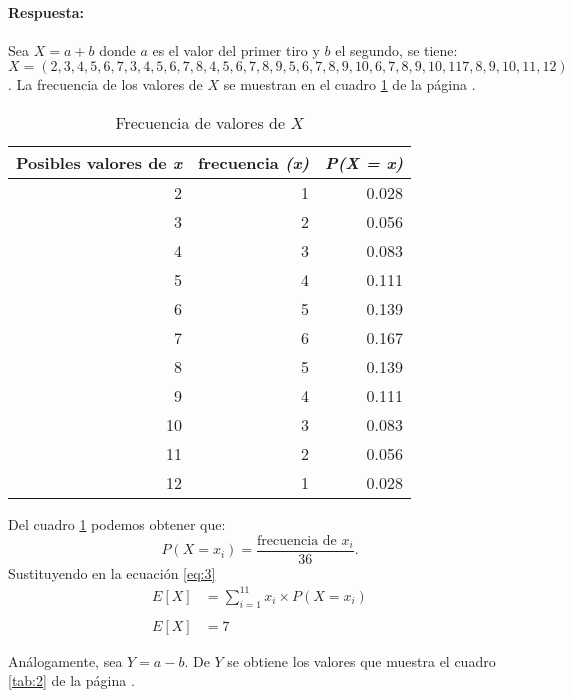 \documentclass{article}
\begin{document}
\paragraph{Respuesta:} Sea $X = a + b$ donde $a$ es el valor del primer tiro y $b$ el segundo, se tiene:
$ X = (2, 3, 4, 5, 6, 7, 3, 4, 5, 6, 7, 8, 4, 5, 6, 7, 8, 9, 5, 6, 7, 8, 9, 10, 6, 7, 8, 9,10,11  7, 8, 9, 10,11, 12)$. La frecuencia de los valores de $X$ se muestran en el cuadro \ref{tab:1} de la página \pageref{tab:1}.

\begin{table}[H]
  \centering
  \caption{Frecuencia de valores de $X$}
    \begin{tabular}{rrr}
    \toprule
    \multicolumn{1}{p{5.39em}}{\textbf{Posibles valores de \textit{\textbf{x}}}} & \multicolumn{1}{l}{\textbf{frecuencia  \textit{\textbf{(x)}}}} & \multicolumn{1}{l}{\textit{\textbf{P(X = x)}}} \\
    \midrule
    2     & 1     & 0.028 \\
    3     & 2     & 0.056 \\
    4     & 3     & 0.083 \\
    5     & 4     & 0.111 \\
    6     & 5     & 0.139 \\
    7     & 6     & 0.167 \\
    8     & 5     & 0.139 \\
    9     & 4     & 0.111 \\
    10    & 3     & 0.083 \\
    11    & 2     & 0.056 \\
    12    & 1     & 0.028 \\
    \bottomrule
    \end{tabular}%
  \label{tab:1}%
\end{table}%

Del cuadro \ref{tab:1} podemos obtener que:
\begin{equation}
 P(X=x_{i})= \frac{\text{frecuencia de $x_{i}$} }{36}.   
\end{equation}
Sustituyendo en la ecuación \ref{eq:3}
\begin{equation}
\begin{array}{ll}
   E[X] &= \sum_{i=1}^{11} x_{i}  \times P(X=x_{i})\\
   &\\
   E[X] & = 7
  \end{array}
\end{equation}

Análogamente, sea $Y= a-b$. De $Y$ se obtiene los valores que muestra el cuadro \ref{tab:2} de la página \pageref{tab:2}.
\end{document}
